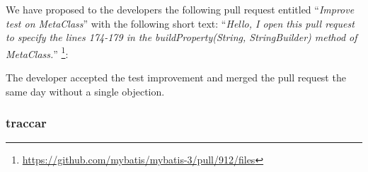 We have proposed to the developers the following pull request entitled ``\emph{Improve test on MetaClass}'' with the following short text: ``\emph{Hello, I open this pull request to specify the lines 174-179 in the buildProperty(String, StringBuilder) method of MetaClass.}'' \footnote{\url{https://github.com/mybatis/mybatis-3/pull/912/files}}:
\begin{figure}[H]
	\centering{}
\end{figure}

The developer accepted the test improvement and merged the pull request the same day without a single objection. 


\subsubsection{traccar}


